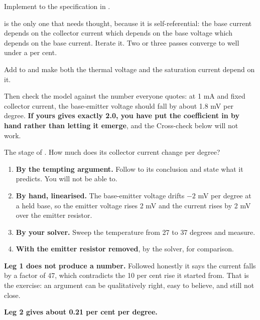 \label{c6:ex:6}
Implement  to the specification in .

 is the only one that needs thought, because it is self-referential: the base current depends on the collector current which depends on the base voltage which depends on the base current. Iterate it. Two or three passes converge to well under a per cent.

\label{c6:ex:7}
Add  to  and make both the thermal voltage and the saturation current depend on it.

Then check the model against the number everyone quotes: at 1 mA and fixed collector current, the base-emitter voltage should fall by about 1.8 mV per degree. \textbf{If yours gives exactly 2.0, you have put the coefficient in by hand rather than letting it emerge}, and the Cross-check below will not work.

\label{c6:ex:8}
The stage of . How much does its collector current change per degree?

\begin{enumerate}
  \item \textbf{By the tempting argument.} Follow  to its conclusion and state what it predicts. You will not be able to.
  \item \textbf{By hand, linearised.} The base-emitter voltage drifts $-2$ mV per degree at a held base, so the emitter voltage rises 2 mV and the current rises by 2 mV over the emitter resistor.
  \item \textbf{By your solver.} Sweep the temperature from 27 to 37 degrees and measure.
  \item \textbf{With the emitter resistor removed}, by the solver, for comparison.
\end{enumerate}

\textbf{Leg 1 does not produce a number.} Followed honestly it says the current falls by a factor of 47, which contradicts the 10 per cent rise it started from. That is the exercise: an argument can be qualitatively right, easy to believe, and still not close.

\textbf{Leg 2 gives about 0.21 per cent per degree.}


